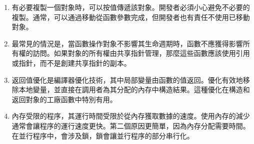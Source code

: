 \begin{enumerate}
\item 
有必要複製一個對象時，可以按值傳遞該對象。開發者必須小心避免不必要的複製。通常，可以通過移動從函數參數完成，但開發者也有責任不使用已移動對象。

\item 
最常見的情況是，當函數操作對象不影響其生命週期時，函數不應獲得影響所有權的訪問。如果對象的所有權由共享指針管理，那麼這些函數應該使用引用或指針，而不是創建共享指針的副本。

\item 
返回值優化是編譯器優化技術，其中局部變量由函數的值返回。優化有效地移除本地變量，並直接在調用者為其分配的內存中構造結果。這種優化在構造和返回對象的工廠函數中特別有用。

\item
內存受限的程序，其運行時間受限於從內存獲取數據的速度。使用內存的減少通常會讓程序的運行速度更快。第二個原因更簡單，因為內存分配需要時間。在並行程序中，會涉及鎖，鎖會讓並行程序的部分串行化。

\end{enumerate}